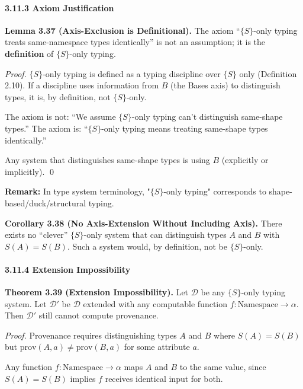 \paragraph{3.11.3 Axiom Justification}\label{axiom-justification}

\textbf{Lemma 3.37 (Axis-Exclusion is Definitional).}\label{lem:shape-axiom-definitional}
The axiom
``$\{S\}$-only typing treats same-namespace types identically'' is not an
assumption; it is the \textbf{definition} of $\{S\}$-only typing.

\emph{Proof.} $\{S\}$-only typing is defined as a typing discipline over
\(\{S\}\) only (Definition 2.10). If a discipline uses information from
\(B\) (the Bases axis) to distinguish types, it is, by definition, not
$\{S\}$-only.

The axiom is not: ``We assume $\{S\}$-only typing can't distinguish same-shape
types.'' The axiom is: ``$\{S\}$-only typing means treating same-shape types
identically.''

Any system that distinguishes same-shape types is using \(B\)
(explicitly or implicitly). \qed

\textbf{Remark:} In type system terminology, "$\{S\}$-only typing" corresponds to shape-based/duck/structural typing.

\textbf{Corollary 3.38 (No Axis-Extension Without Including Axis).} There exists no
``clever'' $\{S\}$-only system that can distinguish types \(A\) and \(B\)
with \(S(A) = S(B)\). Such a system would, by definition, not be
$\{S\}$-only.

\paragraph{3.11.4 Extension
Impossibility}\label{extension-impossibility}

\textbf{Theorem 3.39 (Extension Impossibility).}\label{thm:extension-impossibility}
Let \(\mathcal{D}\) be
any $\{S\}$-only typing system. Let \(\mathcal{D}'\) be \(\mathcal{D}\) extended
with any computable function \(f : \text{Namespace} \to \alpha\). Then
\(\mathcal{D}'\) still cannot compute provenance.

\emph{Proof.} Provenance requires distinguishing types \(A\) and \(B\)
where \(S(A) = S(B)\) but \(\text{prov}(A, a) \neq \text{prov}(B, a)\)
for some attribute \(a\).

Any function \(f : \text{Namespace} \to \alpha\) maps \(A\) and \(B\) to
the same value, since \(S(A) = S(B)\) implies \(f\) receives identical
input for both.

